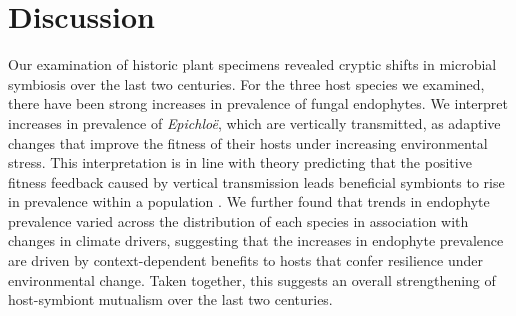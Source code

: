 \documentclass[11pt]{article}
\let\cite\citep
\begin{document}
\section*{Discussion}
Our examination of historic plant specimens revealed cryptic shifts in microbial symbiosis over the last two centuries. 
For the three host species we examined, there have been strong increases in prevalence of fungal endophytes.
We interpret increases in prevalence of \emph{Epichloë}, which are vertically transmitted, as adaptive changes that improve the fitness of their hosts under increasing environmental stress.
This interpretation is in line with theory predicting that the positive fitness feedback caused by vertical transmission leads beneficial symbionts to rise in prevalence within a population \cite{fine1975vectors,donald2021context}.
We further found that trends in endophyte prevalence varied across the distribution of each species in association with changes in climate drivers, suggesting that the increases in endophyte prevalence are driven by context-dependent benefits to hosts that confer resilience under environmental change.
Taken together, this suggests an overall strengthening of host-symbiont mutualism over the last two centuries.
\end{document}
